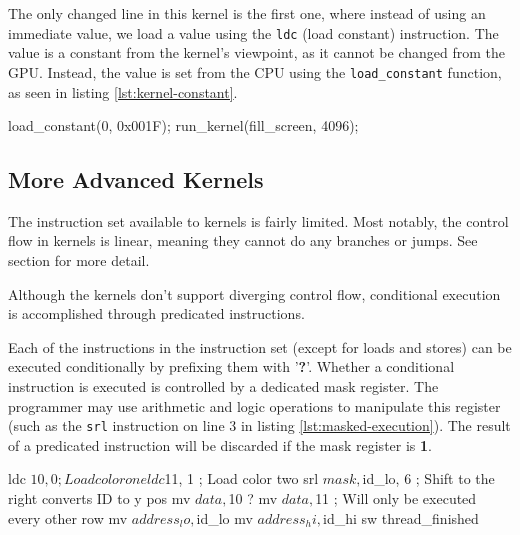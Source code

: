 \documentclass[../main/report.tex]{subfiles}
\begin{document}

The only changed line in this kernel is the first one,
where instead of using an immediate value, we load a value using the \verb/ldc/ (load constant) instruction.
The value is a constant from the kernel's viewpoint, as it cannot be changed from the GPU.
Instead, the value is set from the CPU using the \verb/load_constant/ function,
as seen in listing \ref{lst:kernel-constant}.

\begin{c-code}[caption=Now drawing a blue screen using parameters, label=lst:kernel-constant]
load_constant(0, 0x001F);
run_kernel(fill_screen, 4096);
\end{c-code}

\subsection{More Advanced Kernels}
\label{subsec:masking_kernels}
The instruction set available to kernels is fairly limited.
Most notably, the control flow in kernels is linear, meaning they cannot do any branches or jumps. See section \label{sec:demolicious-demo-machine} for more detail.

Although the kernels don't support diverging control flow,
conditional execution is accomplished through predicated instructions.

Each of the instructions in the instruction set (except for loads and stores) can be executed conditionally by prefixing them with '\textbf{?}'.
Whether a conditional instruction is executed is controlled by a dedicated mask register.
The programmer may use arithmetic and logic operations to manipulate this register (such as the \verb/srl/ instruction on line 3 in listing \ref{lst:masked-execution}).
The result of a predicated instruction will be discarded if the mask register is \textbf{1}.

\begin{assembly}[caption=Conditional execution using predicated instructions, label=lst:masked-execution]
ldc $10, 0 ; Load color one
ldc $11, 1 ; Load color two
srl $mask, $id_lo, 6 ; Shift to the right converts ID to y pos
mv $data, $10 
? mv $data, $11 ; Will only be executed every other row
mv $address_lo, $id_lo
mv $address_hi, $id_hi
sw
thread_finished
\end{assembly}
\end{document}
